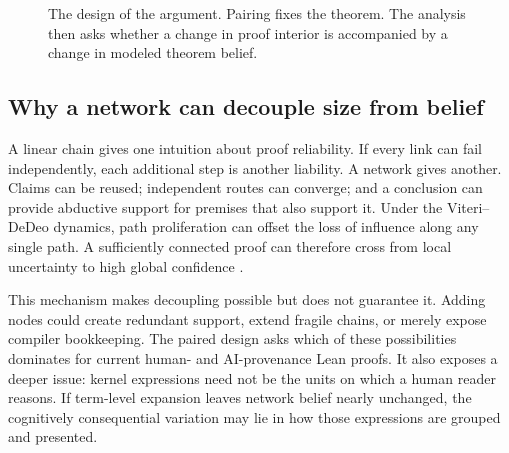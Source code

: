 \documentclass[11pt]{article}
\begin{document}
\begin{figure}[t]
\centering
{}
\caption{The design of the argument.  Pairing fixes the theorem.  The analysis then asks whether a
change in proof interior is accompanied by a change in modeled theorem belief.}
\label{fig:framework}
\end{figure}

\subsection{Why a network can decouple size from belief}

A linear chain gives one intuition about proof reliability.  If every link can fail independently,
each additional step is another liability.  A network gives another.  Claims can be reused;
independent routes can converge; and a conclusion can provide abductive support for premises that
also support it.  Under the Viteri--DeDeo dynamics, path proliferation can offset the loss of
influence along any single path.  A sufficiently connected proof can therefore cross from local
uncertainty to high global confidence \citep{viteri2022}.

This mechanism makes decoupling possible but does not guarantee it.  Adding nodes could create
redundant support, extend fragile chains, or merely expose compiler bookkeeping.  The paired design
asks which of these possibilities dominates for current human- and AI-provenance Lean proofs.  It
also exposes a deeper issue: kernel expressions need not be the units on which a human reader
reasons.  If term-level expansion leaves network belief nearly unchanged, the cognitively consequential
variation may lie in how those expressions are grouped and presented.
\end{document}
